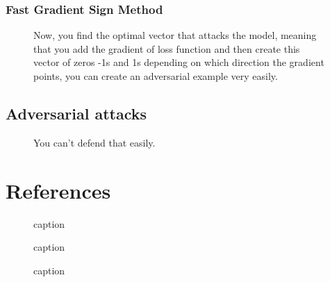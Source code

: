 \documentclass[11pt]{article}
\begin{document}
\subsubsection{Fast Gradient Sign Method}

\begin{figure}[H]
    \centering
    \caption{Now, you find the optimal vector that attacks the model, meaning that you add the gradient of loss function and then create this vector of zeros -1s and 1s depending on which direction the gradient points, you can create an adversarial example very easily.}
\end{figure}

\subsection{Adversarial attacks}

\begin{figure}[H]
    \centering
    \caption{You can't defend that easily.}
\end{figure}

\appendix

\section{References}

\begin{figure}[H]
    \centering
    \caption{caption}
\end{figure}

\begin{figure}[H]
    \centering
    \caption{caption}
\end{figure}

\begin{figure}[H]
    \centering
    \caption{caption}
\end{figure}
\end{document}
